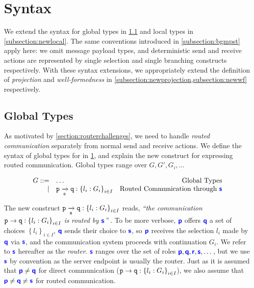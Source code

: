 \section{Syntax}
\label{section:syntax}

We extend the syntax for global types
in \cref{subsection:newglobal} and
local types in \cref{subsection:newlocal}.
The same conventions introduced in \cref{subsection:bgmpst}
apply here: 
we omit message payload types,
and deterministic send and receive actions
are represented by single selection and
single branching constructs respectively.
With these syntax extensions, we appropriately extend
the definition of \textit{projection} and 
\textit{well-formedness} in 
\cref{subsection:newprojection,subsection:newwf}
respectively.

\subsection{Global Types}
\label{subsection:newglobal}

As motivated by \cref{section:routerchallenges},
we need to handle \textit{routed communication} separately
from normal send and receive actions.
We define the syntax of global types for \newtheory 
in \cref{fig:newsyntaxglobal}, and explain the 
new construct for expressing routed communication.
Global types range over $G, G', G_i, \dots$

\begin{figure}[!h]
\doublespacing
\[
\begin{array}{rlr}
G ::= & \dots & \text{Global Types} \\
\mid & \groute{p}{q}{s}{l_i: G_i}{i \in I}
& \text{Routed Communication through $\role{s}$} \\
\end{array}
\]
\singlespacing
{}
\label{fig:newsyntaxglobal}
\end{figure}

The new construct $\groute{p}{q}{s}{l_i: G_i}{i \in I}$ reads, 
\textit{
``the communication $\gcomm{p}{q}{l_i: G_i}{i \in I}$
is routed by $\role{s}$''
}.
To be more verbose,
$\role{p}$ offers $\role{q}$ a set of choices
$\left\{l_i\right\}_{i \in I}$,
$\role{q}$ sends their choice to
$\role{s}$, so $\role{p}$ receives the
selection $l_i$ made by $\role{q}$ via $\role{s}$,
and the communication system proceeds with continuation $G_i$.
We refer to $\role{s}$ hereafter as the \textit{router}.
$\role{s}$ ranges over the set of roles 
$\role{p},\role{q},\role{r},\role{s},\dots$,
but we use $\role{s}$ by convention as the server endpoint
is usually the router.
Just as it is assumed that $\role{p} \neq \role{q}$ for
direct communication ($\gcomm{p}{q}{l_i: G_i}{i \in I}$),
we also assume that
$\role{p} \neq \role{q} \neq \role{s}$ for routed communication.

